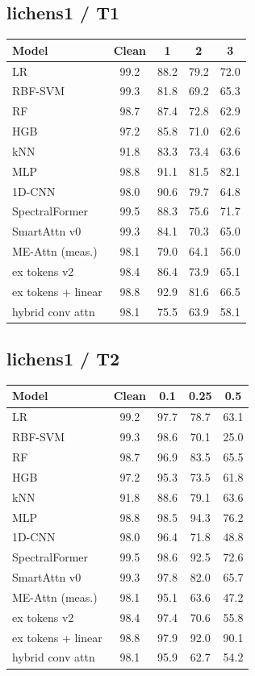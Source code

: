 \subsection*{lichens1 / T1}
\small
\begin{tabular}{lcccc}
\toprule
Model & Clean & 1 & 2 & 3 \\
\midrule
LR & 99.2 & 88.2 & 79.2 & 72.0 \\
RBF-SVM & 99.3 & 81.8 & 69.2 & 65.3 \\
RF & 98.7 & 87.4 & 72.8 & 62.9 \\
HGB & 97.2 & 85.8 & 71.0 & 62.6 \\
kNN & 91.8 & 83.3 & 73.4 & 63.6 \\
MLP & 98.8 & 91.1 & 81.5 & 82.1 \\
1D-CNN & 98.0 & 90.6 & 79.7 & 64.8 \\
SpectralFormer & 99.5 & 88.3 & 75.6 & 71.7 \\
SmartAttn v0 & 99.3 & 84.1 & 70.3 & 65.0 \\
ME-Attn (meas.) & 98.1 & 79.0 & 64.1 & 56.0 \\
ex tokens v2 & 98.4 & 86.4 & 73.9 & 65.1 \\
ex tokens + linear & 98.8 & 92.9 & 81.6 & 66.5 \\
hybrid conv attn & 98.1 & 75.5 & 63.9 & 58.1 \\
\bottomrule
\end{tabular}

\subsection*{lichens1 / T2}
\small
\begin{tabular}{lcccc}
\toprule
Model & Clean & 0.1 & 0.25 & 0.5 \\
\midrule
LR & 99.2 & 97.7 & 78.7 & 63.1 \\
RBF-SVM & 99.3 & 98.6 & 70.1 & 25.0 \\
RF & 98.7 & 96.9 & 83.5 & 65.5 \\
HGB & 97.2 & 95.3 & 73.5 & 61.8 \\
kNN & 91.8 & 88.6 & 79.1 & 63.6 \\
MLP & 98.8 & 98.5 & 94.3 & 76.2 \\
1D-CNN & 98.0 & 96.4 & 71.8 & 48.8 \\
SpectralFormer & 99.5 & 98.6 & 92.5 & 72.6 \\
SmartAttn v0 & 99.3 & 97.8 & 82.0 & 65.7 \\
ME-Attn (meas.) & 98.1 & 95.1 & 63.6 & 47.2 \\
ex tokens v2 & 98.4 & 97.4 & 70.6 & 55.8 \\
ex tokens + linear & 98.8 & 97.9 & 92.0 & 90.1 \\
hybrid conv attn & 98.1 & 95.9 & 62.7 & 54.2 \\
\bottomrule
\end{tabular}

